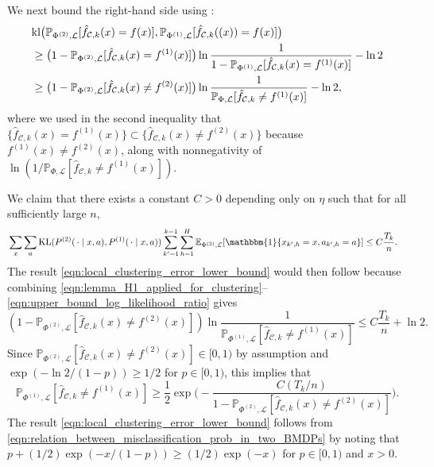 \documentclass[11pt]{article}
\newcommand{\mcC}{\mathcal{C}}
\newcommand{\mcL}{\mathcal{L}}
\newcommand{\mbbP}{\mathbb{P}}
\newcommand{\mbbE}{\mathbb{E}}
\newcommand{\kl}{\textnormal{kl}}
\newcommand{\KL}{\textnormal{KL}}
\theoremstyle{definition}
\theoremstyle{definition}
\begin{document}
We next bound the right-hand side using \cite[(11)]{doi:10.1287/moor.2017.0928}:
\begin{equation}
	\begin{split}
		 &
		\kl\bigl(
			\mbbP_{\Phi^{(2)},\mcL}
			[\hat{f}_{\mcC,k}(x)=f(x)]
			,
			\mbbP_{\Phi^{(1)},\mcL}
			[\hat{f}_{\mcC,k}((x))=f(x)]
		\bigr)
		\\
		 &
		\geq
		\bigl(
			1-\mbbP_{\Phi^{(2)},\mcL}[\hat{f}_{\mcC,k}(x)=f^{(1)}(x)]
		\bigr)
		\ln \frac{1}{1-\mbbP_{\Phi^{(1)},\mcL}[\hat{f}_{\mcC,k}(x)=f^{(1)}(x)]}-\ln 2
		\\
		 &
		\geq
		\bigl(
			1-\mbbP_{\Phi^{(2)},\mcL}[\hat{f}_{\mcC,k}(x)\neq f^{(2)}(x)]
		\bigr)
		\ln \frac{1}{\mbbP_{\Phi,\mcL}[\hat{f}_{\mcC,k}\neq f^{(1)}(x)]}
		-
		\ln 2
		,
	\end{split}
\end{equation}
where we used in the second inequality that $\{\hat{f}_{\mcC,k}(x)=f^{(1)}(x)\}\subset \{\hat{f}_{\mcC,k}(x)\neq f^{(2)}(x)\}$ because $f^{(1)}(x)\neq f^{(2)}(x)$, along with nonnegativity of $\ln (1/\mbbP_{\Phi,\mcL}[\hat{f}_{\mcC,k}\neq f^{(1)}(x)])$.

We claim that there exists a constant $C>0$ depending only on $\eta$ such that for all sufficiently large $n$,
\begin{align}
	\label{eqn:upper_bound_log_likelihood_ratio}
	 &
	\sum_x
	\sum_a
	\KL(P^{(2)}(\,\cdot\mid x,a),P^{(1)}(\,\cdot\mid x,a))
	\sum_{k'=1}^{k-1}
	\sum_{h=1}^H
	\mbbE_{\Phi^{(2)},\mcL}[\mathbbm{1}\{x_{k',h}=x,a_{k',h}=a\}]
	\leq
	C\frac{T_k}{n}
	.
\end{align}
The result \eqref{eqn:local_clustering_error_lower_bound} would then follow because combining \eqref{eqn:lemma_H1_applied_for_clustering}--\eqref{eqn:upper_bound_log_likelihood_ratio} gives
\begin{equation}
	(1-\mbbP_{\Phi^{(2)},\mcL}[\hat{f}_{\mcC,k}(x)\neq f^{(2)}(x)])\ln \frac{1}{\mbbP_{\Phi^{(1)},\mcL}[\hat{f}_{\mcC,k}\neq f^{(1)}(x)]}
	\leq
	C\frac{T_k}{n}+\ln 2.
\end{equation}
Since $\mbbP_{\Phi^{(2)},\mcL}[\hat{f}_{\mcC,k}(x)\neq f^{(2)}(x)]\in [0,1)$ by assumption and $\exp(-\ln 2/(1-p))\geq 1/2$ for $p\in [0,1)$, this implies that
\begin{equation}
	\label{eqn:relation_between_misclassification_prob_in_two_BMDPs}
	\mbbP_{\Phi^{(1)},\mcL}[\hat{f}_{\mcC,k}\neq f^{(1)}(x)]
	\geq
	\frac{1}{2}
	\exp\biggl(
	-
	\frac{C(T_k/n)}{1-\mbbP_{\Phi^{(2)},\mcL}[\hat{f}_{\mcC,k}(x)\neq f^{(2)}(x)]}
	\biggr)
	.
\end{equation}
The result \eqref{eqn:local_clustering_error_lower_bound} follows from \eqref{eqn:relation_between_misclassification_prob_in_two_BMDPs} by noting that $p+(1/2)\exp(-x/(1-p))\geq (1/2)\exp(-x)$ for $p\in[0,1)$ and $x>0$.
\end{document}
